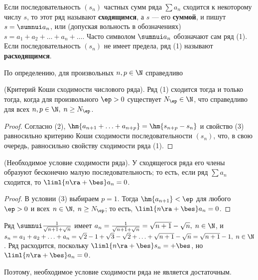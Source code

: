 \documentclass[a4paper]{article}
\newenvironment{imp*}{\par\vskip\theoremskip\textbf{Следствие.}\normalfont \itshape}{\par\vskip\theoremskip}
\begin{document}
Если последовательность $(s_n)$ частных сумм ряда $\sum a_n$
сходится к некоторому числу $s$, то этот ряд называют
\textbf{сходящимся}, а $s$ --- его \textbf{суммой}, и пишут
$s=\sumnui a_n$, или (допуская вольность в обозначениях)
$s=a_1+a_2+\ldots+a_n+\ldots$. Часто символом $\sumnui a_n$
обозначают сам ряд (1). Если последовательность $(s_n)$ не имеет
предела, ряд (1) называют \textbf{расходящимся}.

По определению, для произвольных $n,p\in\N$ справедливо

\begin{theorem}
(Критерий Коши сходимости числового ряда). Ряд (1) сходится тогда и
только тогда, когда для произвольного $\ep>0$ существует
$N_{\ep}\in\N$, что 
справедливо для всех $n,p\in\N, \; n\ge N_{\ep}$.
\end{theorem}

\begin{proof}
Согласно (2), $\hm{a_{n+1}+\ldots+a_{n+p}}=\hm{s_{n+p}-s_{n}}$ и
свойство (3) равносильно критерию Коши сходимости последовательности
$(s_n)$, что, в свою очередь, равносильно свойству сходимости ряда
(1).
\end{proof}

\begin{imp*}
(Необходимое условие сходимости ряда). У сходящегося ряда его члены
образуют бесконечно малую последовательность; то есть, если ряд
$\sum a_n$ сходится, то $\liml{n\ra+\bes}a_n=0$.
\end{imp*}

\begin{proof}
В условии (3) выбираем $p=1$. Тогда $\hm{a_{n+1}}<\ep$ для любого
$\ep>0$ и всех $n\in\N, \; n\ge N_{\ep}$; то есть, $\liml{n\ra+\bes}
a_n=0$.
\end{proof}

\begin{ex}
Ряд $\sumnui \frac1{\sqrt{n+1}+\sqrt{n}}$ имеет
$a_n=\frac1{\sqrt{n+1}+\sqrt{n}} = \sqrt{n+1}-\sqrt{n}, \; n\in\N$,
и $s_n=a_1+a_2 + \ldots + a_n = \sqrt2 - 1 + \sqrt3 -\sqrt2 + \ldots
+ \sqrt{n+1}-\sqrt{n}=\sqrt{n+1}-1, \; n\in\N$. Ряд расходится,
поскольку $\liml{n\ra+\bes}s_n=+\bes$, но $\liml{n\ra+\bes}a_n=0$.
\end{ex}

Поэтому, необходимое условие сходимости ряда не является
достаточным.
\end{document}
